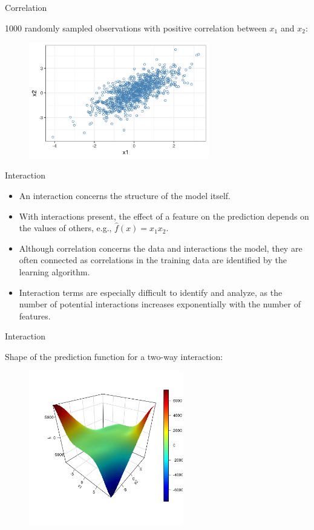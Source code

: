 \documentclass[11pt,compress,t,notes=noshow, xcolor=table]{beamer}
\begin{document}
\begin{vbframe}{Correlation}

1000 randomly sampled observations with positive correlation between $x_1$ and $x_2$:
\medskip
\begin{figure}
\includegraphics[width = 0.7\textwidth]{figure/correlation}
\end{figure}
\end{vbframe}

\begin{vbframe}{Interaction}
\begin{itemize}
\itemsep2em
\item An interaction concerns the structure of the model itself.
\item With interactions present, the effect of a feature on the prediction depends on the values of others, e.g., $\widehat{f}(x) = x_1 x_2$.
\item Although correlation concerns the data and interactions the model, they are often connected as correlations in the training data are identified by the learning algorithm.
\item Interaction terms are especially difficult to identify and analyze, as the number of potential interactions increases exponentially with the number of features.
\end{itemize}
\end{vbframe}

\begin{vbframe}{Interaction}

Shape of the prediction function for a two-way interaction:

\begin{figure}
\includegraphics[width = 0.6\textwidth]{figure/interaction}
\end{figure}
\end{vbframe}
\end{document}
